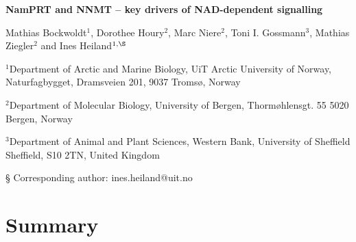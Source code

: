 \documentclass[paper=a4, 12pt]{scrartcl}
\begin{document}
\noindent
{\huge\sffamily\bfseries NamPRT and NNMT – key drivers of NAD-dependent signalling \par}

\vspace{2cm}

\noindent
Mathias Bockwoldt$^{1}$, Dorothee Houry$^{2}$,  Marc Niere$^{2}$, Toni I. Gossmann$^{3}$, Mathias Ziegler$^{2}$ and Ines Heiland$^{1,\S}$

\vspace{1cm}

\noindent
$^{1}$Department of Arctic and Marine Biology, UiT Arctic University of Norway, Naturfagbygget, Dramsveien 201, 9037 Tromsø, Norway

\noindent
$^{2}$Department of Molecular Biology, University of Bergen, Thormøhlensgt. 55
5020 Bergen, Norway

\noindent
$^{3}$Department of Animal and Plant Sciences, Western Bank, University of Sheffield
Sheffield, S10 2TN, United Kingdom

\noindent
§ Corresponding author: ines.heiland@uit.no


\section{Summary}
\end{document}
